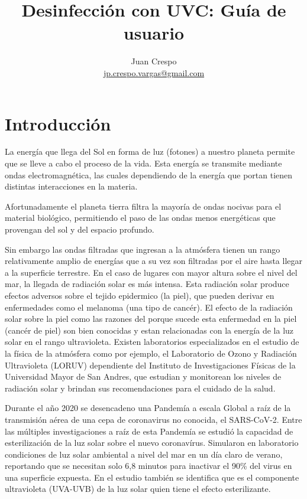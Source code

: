 \documentclass[letterpaper,12pt]{article}
\date{} %
\title{Desinfección con UVC: Guía de usuario}
\author{Juan Crespo  \\  \url{jp.crespo.vargas@gmail.com}
}
\begin{document}
\maketitle


\begin{abstract}
  
\end{abstract}
  
\section{Introducción}
\label{sec:intro}
La energía que llega del Sol en forma de luz (fotones) a nuestro planeta permite que se lleve a cabo el proceso de la vida. Esta energía se transmite mediante ondas electromagnética, las cuales dependiendo de la energía que portan tienen distintas interacciones en la materia. 

Afortunadamente el planeta tierra filtra la mayoría de ondas nocivas para el material biológico, permitiendo el paso de las ondas menos energéticas que provengan del sol y del espacio profundo.

Sin embargo las ondas filtradas que ingresan a la atmósfera tienen un rango relativamente amplio de energías que a su vez son filtradas por el aire hasta llegar a la superficie terrestre. En el caso de lugares con mayor altura sobre el nivel del mar, la llegada de radiación solar es más intensa. Esta radiación solar produce efectos adversos sobre el tejido epidermico (la piel), que pueden derivar en enfermedades como el melanoma (una tipo de cancér). El efecto de la radiación solar sobre la piel como las razones del porque sucede esta enfermedad en la piel (cancér de piel) son bien conocidas y estan relacionadas con la energía de la luz solar en el rango ultravioleta. Existen laboratorios especializados en el estudio de la física de la atmósfera como por ejemplo, el Laboratorio de Ozono y Radiación Ultravioleta (LORUV) dependiente del Instituto de Investigaciones Físicas de la Universidad Mayor de San Andres, que estudian y monitorean los niveles de radiación solar y brindan sus recomendaciones para el cuidado de la salud. 

Durante el año 2020 se desencadeno una Pandemía a escala Global a raíz de la transmisión aérea de una cepa de coronavirus no conocida, el SARS-CoV-2. Entre las múltiples investigaciones a raíz de esta Pandemía se estudió la capacidad de esterilización de la luz solar \cite{covidsol} sobre el nuevo coronavírus. Simularon en laboratorio condiciones de luz solar ambiental a nivel del mar en un día claro de verano, reportando que se necesitan solo 6,8 minutos para inactivar el 90\% del virus en una superficie expuesta. En el estudio también se identifica que es el componente ultravioleta (UVA-UVB) de la luz solar quien tiene el efecto esterilizante. 
\end{document}
